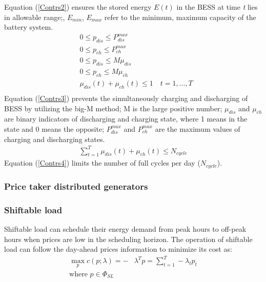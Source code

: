 \documentclass[journal]{IEEEtran}
\begin{document}
Equation (\ref{Contrs2}) ensures the stored energy $E(t)$ in the BESS at time \textit{t} lies in allowable range;, $E_{min}$, $E_{max}$ refer to the minimum, maximum capacity of the battery system.
\begin{equation}
  \label{Contrs3}
  \begin{aligned}
    & 0 \leq p_{dis} \leq P_{dis}^{max} \\
    & 0 \leq p_{ch} \leq P_{ch}^{max}  \\
    & 0 \leq p_{dis} \leq M \mu_{dis}   \\
    & 0 \leq p_{ch} \leq M \mu_{ch}     \\
    & \mu_{dis}(t) + \mu_{ch}(t) \leq 1 \quad t=1,...,T\\
  \end{aligned}
\end{equation}
Equation (\ref{Contrs3}) prevents the simultaneously charging and discharging of BESS by utilizing the big-M method; M is the large positive number; $\mu_{dis}$ and $\mu_{ch}$ are binary indicators of discharging and charging state, where 1 means in the state and 0 means the opposite; $P_{dis}^{max}$ and $P_{ch}^{max}$ are the maximum values of charging and discharging states.
\begin{equation}
  \label{Contrs4}
  \begin{aligned}
    \sum_{t=1}^T \mu_{dis}(t) + \mu_{ch}(t) \leq N_{cycle}
  \end{aligned}
\end{equation}
Equation (\ref{Contrs4}) limits the number of full cycles per day ($N_{cycle}$).


\subsubsection{Price taker distributed generators}

\subsubsection{Shiftable load}
Shiftable load can schedule their energy demand from peak hours to off-peak hours when prices are low in the scheduling horizon. The operation of shiftable load can follow the day-ahead prices information to minimize its cost as: 
\begin{equation}
  \label{SLobj}
  \begin{aligned}
    \max_{p} c(p; \lambda) = - &\lambda^T p = \sum_{t=1}^T - \lambda_t p_t \\
    \text{where }  p \in \Phi_{SL} \\
  \end{aligned}
\end{equation}
\end{document}
